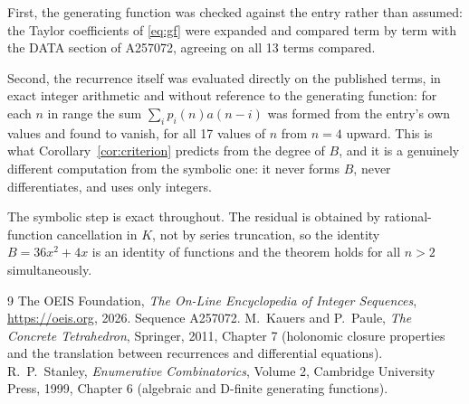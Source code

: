 \documentclass[11pt,a4paper]{article}
\theoremstyle{plain}
\theoremstyle{definition}
\begin{document}
First, the generating function was checked against the entry rather than assumed: the
Taylor coefficients of \eqref{eq:gf} were expanded and compared term by term with the DATA
section of A257072, agreeing on all 13 terms compared.

Second, the recurrence itself was evaluated directly on the published terms, in exact
integer arithmetic and without reference to the generating function: for each $n$ in range
the sum $\sum_{i}p_{i}(n)a(n-i)$ was formed from the entry's own values and found to
vanish, for all 17 values of $n$ from $n=4$ upward. This is what
Corollary~\ref{cor:criterion} predicts from the degree of $B$, and it is a genuinely
different computation from the symbolic one: it never forms $B$, never differentiates, and
uses only integers.

The symbolic step is exact throughout. The residual is obtained by rational-function
cancellation in $K$, not by series truncation, so the identity $B=36 x^{2} + 4 x$ is an
identity of functions and the theorem holds for all $n>2$ simultaneously.

\begin{thebibliography}{9}
 The OEIS Foundation, \emph{The On-Line Encyclopedia of Integer Sequences},
\url{https://oeis.org}, 2026. Sequence A257072.
 M.~Kauers and P.~Paule, \emph{The Concrete Tetrahedron}, Springer, 2011,
Chapter 7 (holonomic closure properties and the translation between recurrences and
differential equations).
 R.~P.~Stanley, \emph{Enumerative Combinatorics}, Volume 2, Cambridge
University Press, 1999, Chapter 6 (algebraic and D-finite generating functions).
\end{thebibliography}
\end{document}

